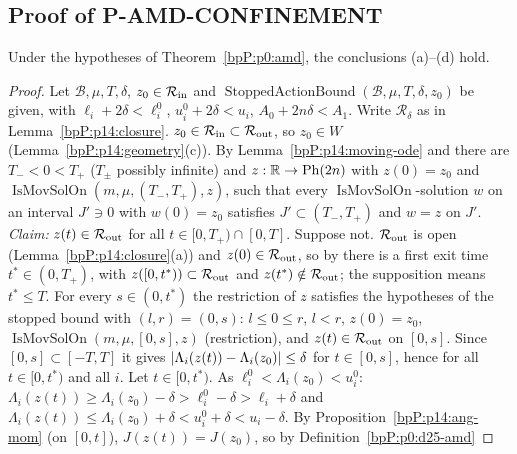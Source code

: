 \subsection{Proof of P-AMD-CONFINEMENT}\label{bpP:p14:sec-amd}

\begin{theorem}\label{bpP:p14:amd}
Under the hypotheses of Theorem~\ref{bpP:p0:amd}, the conclusions (a)--(d) hold.
\end{theorem}
\begin{proof}
Let $\mathcal B,\mu,T,\delta$, $z_0\in\mathcal R_{\rm in}$ and $\operatorname{StoppedActionBound}(\mathcal B,\mu,T,\delta,z_0)$ be given, with $\ell_i+2\delta<\ell_i^0$, $u^0_i+2\delta<u_i$, $A_0+2n\delta<A_1$. Write $\mathcal R_\delta$ as in Lemma~\ref{bpP:p14:closure}.
\label{stepP:p14:amd-max} $z_0\in\mathcal R_{\rm in}\subset\mathcal R_{\rm out}$, so $z_0\in W$ (Lemma~\ref{bpP:p14:geometry}(c)). By Lemma~\ref{bpP:p14:moving-ode} and  there are $T_-<0<T_+$ ($T_\pm$ possibly infinite) and $z:\mathbb{R}\to\mathrm{Ph}(2n)$ with $z(0)=z_0$ and $\operatorname{IsMovSolOn}(m,\mu,(T_-,T_+),z)$, such that every $\operatorname{IsMovSolOn}$-solution $w$ on an interval $J'\ni0$ with $w(0)=z_0$ satisfies $J'\subset(T_-,T_+)$ and $w=z$ on $J'$.
\label{stepP:p14:amd-fwd} \emph{Claim:} $z(t)\in\mathcal R_{\rm out}$ for all $t\in[0,T_+)\cap[0,T]$. Suppose not. $\mathcal R_{\rm out}$ is open (Lemma~\ref{bpP:p14:closure}(a)) and $z(0)\in\mathcal R_{\rm out}$, so by  there is a first exit time $t^*\in(0,T_+)$, with $z([0,t^*))\subset\mathcal R_{\rm out}$ and $z(t^*)\notin\mathcal R_{\rm out}$; the supposition means $t^*\le T$.
For every $s\in(0,t^*)$ the restriction of $z$ satisfies the hypotheses of the stopped bound with $(l,r)=(0,s)$: $l\le0\le r$, $l<r$, $z(0)=z_0$, $\operatorname{IsMovSolOn}(m,\mu,[0,s],z)$ (restriction), and $z(t)\in\mathcal R_{\rm out}$ on $[0,s]$. Since $[0,s]\subset[-T,T]$ it gives $\lvert \Lambda_i(z(t))-\Lambda_i(z_0)\rvert\le\delta$ for $t\in[0,s]$, hence for all $t\in[0,t^*)$ and all $i$.
\label{stepP:p14:amd-margin} Let $t\in[0,t^*)$. As $\ell^0_i<\Lambda_i(z_0)<u^0_i$: $\Lambda_i(z(t))\ge\Lambda_i(z_0)-\delta>\ell_i^0-\delta>\ell_i+\delta$ and $\Lambda_i(z(t))\le\Lambda_i(z_0)+\delta<u_i^0+\delta<u_i-\delta$. By Proposition~\ref{bpP:p14:ang-mom} (on $[0,t]$), $J(z(t))=J(z_0)$, so by Definition~\ref{bpP:p0:d25-amd}

\end{proof}
